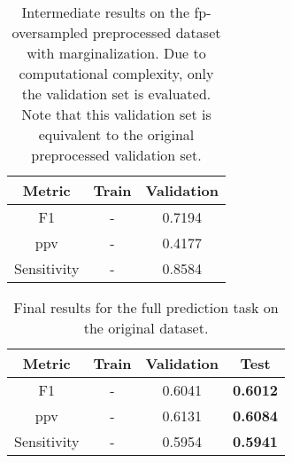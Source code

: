 \begin{table}%
  \centering
  \begin{tabular}{c | c | c}
    Metric & Train & Validation \\
    \hline
    F1 & - & 0.7194 \\
    \gls{ppv} & - & 0.4177 \\
    Sensitivity & - & 0.8584 \\
  \end{tabular}
  \caption{Intermediate results on the \gls{fp}-oversampled preprocessed dataset with marginalization.  Due to computational complexity, only the validation set is evaluated.  Note that this validation set is equivalent to the original preprocessed validation set.}
  \label{tab:res_prep_fp}
\end{table}

\begin{table}%
  \centering
  \begin{tabular}{c | c | c | >{\bfseries}c}
    Metric & Train & Validation & \textnormal{Test} \\
    \hline
    F1 & - & 0.6041 & 0.6012 \\
    \acrshort{ppv} & - & 0.6131 & 0.6084 \\
    Sensitivity & - & 0.5954 & 0.5941 \\
  \end{tabular}
  \caption{Final results for the full prediction task on the original dataset.}
  \label{tab:res_orig}
\end{table}

